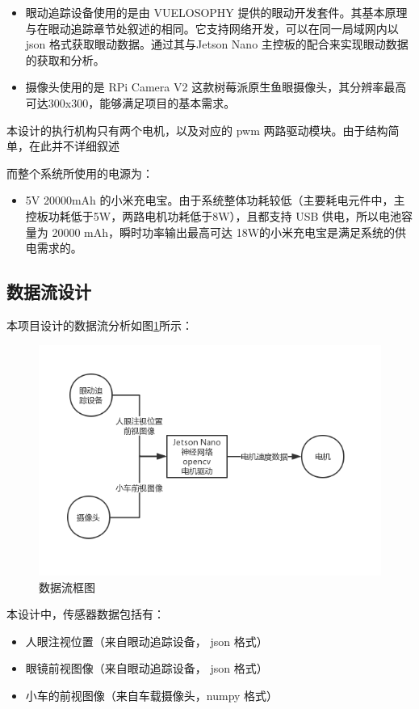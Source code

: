 \documentclass{article}
\begin{document}
\begin{spacing}{1.5}
\begin{itemize}
    \item 眼动追踪设备使用的是由 VUELOSOPHY 提供的眼动开发套件。其基本原理与在眼动追踪章节处叙述的相同。它支持网络开发，可以在同一局域网内以 json 格式获取眼动数据。通过其与Jetson Nano 主控板的配合来实现眼动数据的获取和分析。
    \item 摄像头使用的是 RPi Camera V2 这款树莓派原生鱼眼摄像头，其分辨率最高可达300x300，能够满足项目的基本需求。
\end{itemize}

本设计的执行机构只有两个电机，以及对应的 pwm 两路驱动模块。由于结构简单，在此并不详细叙述

而整个系统所使用的电源为：
\begin{itemize}
    \item 5V 20000mAh 的小米充电宝。由于系统整体功耗较低（主要耗电元件中，主控板功耗低于5W，两路电机功耗低于8W），且都支持 USB 供电，所以电池容量为 20000 mAh，瞬时功率输出最高可达 18W的小米充电宝是满足系统的供电需求的。
\end{itemize}


    \subsection{数据流设计}

    本项目设计的数据流分析如图\ref{fig:data_flow}所示：
\begin{figure}[H]
    \centering
    \includegraphics[scale=0.4]{fig/data_flow.png}
    \caption{数据流框图}
    \label{fig:data_flow}
\end{figure}

本设计中，传感器数据包括有：
\begin{itemize}
    \item 人眼注视位置（来自眼动追踪设备， json 格式）
    \item 眼镜前视图像（来自眼动追踪设备， json 格式）
    \item 小车的前视图像（来自车载摄像头，numpy 格式）
\end{itemize}


\end{spacing}
\end{document}
